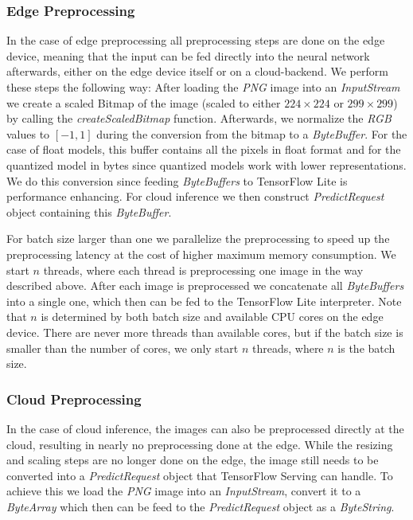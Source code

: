 \subsubsection{Edge Preprocessing}
\label{chap:preproImpl}
In the case of edge preprocessing all preprocessing steps are done on the edge device, meaning that the input can be fed directly into the neural network afterwards, either on the edge device itself or on a cloud-backend.
We perform these steps the following way: After loading the \emph{PNG} image into an \emph{InputStream} we create a scaled Bitmap of the image (scaled to either $224\times224$ or $299\times299$) by calling the \emph{createScaledBitmap} function. 
Afterwards, we normalize the \emph{RGB} values to $[-1,1]$ during the conversion from the bitmap to a \emph{ByteBuffer}. 
For the case of float models, this buffer contains all the pixels in float format and for the quantized model in bytes since quantized models work with lower representations.
We do this conversion since feeding \emph{ByteBuffers} to TensorFlow Lite is performance enhancing. %
For cloud inference we then construct \emph{PredictRequest} object containing this \emph{ByteBuffer}.

For batch size larger than one we parallelize the preprocessing to speed up the preprocessing latency at the cost of higher maximum memory consumption. We start $n$ threads, where each thread is preprocessing one image in the way described above. After each image is preprocessed we concatenate all \emph{ByteBuffers} into a single one, which then can be fed to the TensorFlow Lite interpreter. Note that $n$ is determined by both batch size and available CPU cores on the edge device. There are never more threads than available cores, but if the batch size is smaller than the number of cores, we only start $n$ threads, where $n$ is the batch size. 

\subsubsection{Cloud Preprocessing}

In the case of cloud inference, the images can also be preprocessed directly at the cloud, resulting in nearly no preprocessing done at the edge. While the resizing and scaling steps are no longer done on the edge, the image still needs to be converted into a \emph{PredictRequest} object that TensorFlow Serving can handle.
To achieve this we load the \emph{PNG} image into an \emph{InputStream}, convert it to a \emph{ByteArray} which then can be feed to the \emph{PredictRequest} object as a \emph{ByteString}. 

